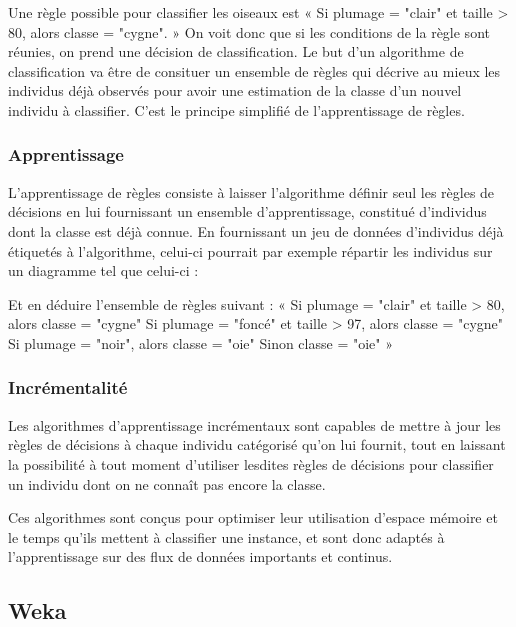             Une règle possible pour classifier les oiseaux est « Si plumage = "clair" et taille > 80, alors classe = "cygne". » On voit donc que si les conditions de la règle sont réunies, on prend une décision de classification. Le but d'un algorithme de classification va être de consituer un ensemble de règles qui décrive au mieux les individus déjà observés pour avoir une estimation de la classe d'un nouvel individu à classifier. C'est le principe simplifié de l'apprentissage de règles.

        \subsubsection{Apprentissage}

            L’apprentissage de règles consiste à laisser l’algorithme définir seul les règles de décisions en lui fournissant un ensemble d’apprentissage, constitué d’individus dont la classe est déjà connue. En fournissant un jeu de données d’individus déjà étiquetés à l’algorithme, celui-ci pourrait par exemple répartir les individus sur un diagramme tel que celui-ci : 

            Et en déduire l’ensemble de règles suivant : 
            « Si plumage = "clair" et taille > 80, alors classe = "cygne"
            Si plumage = "foncé" et taille > 97, alors classe = "cygne"
            Si plumage = "noir", alors classe = "oie"
            Sinon classe = "oie" »


        \subsubsection{Incrémentalité}

            Les algorithmes d’apprentissage incrémentaux sont capables de mettre à jour les règles de décisions à chaque individu catégorisé qu’on lui fournit, tout en laissant la possibilité à tout moment d’utiliser lesdites règles de décisions pour classifier un individu dont on ne connaît pas encore la classe.

            Ces algorithmes sont conçus pour optimiser leur utilisation d'espace mémoire et le temps qu'ils mettent à classifier une instance, et sont donc adaptés à l'apprentissage sur des flux de données importants et continus.

    \subsection{Weka}

